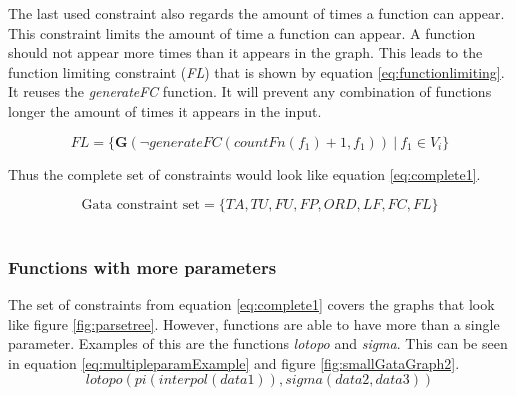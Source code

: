 \documentclass{article}
\begin{document}
The last used constraint also regards the amount of times a function can appear. This constraint limits the amount of time a function can appear. A function should not appear more times than it appears in the graph. This leads to the function limiting constraint (\textit{FL}) that is shown by equation \ref{eq:functionlimiting}. It reuses the \textit{generateFC} function. It will prevent any combination of functions longer the amount of times it appears in the input.

\begin{equation}
    FL = \{ \textbf{G}( \neg  generateFC(countFn(f_1) +1, f_1))\ |\ f_1 \in V_i \} \label{eq:functionlimiting}
\end{equation}


Thus the complete set of constraints would look like equation \ref{eq:complete1}.

\begin{equation}
    \text{Gata constraint set}= \{TA, TU, FU, FP, ORD, LF, FC,FL\} \label{eq:complete1}
\end{equation}
 \\
 
 


\subsubsection{Functions with more parameters}

The set of constraints from equation \ref{eq:complete1} covers the graphs that look like figure \ref{fig:parsetree}. However, functions are able to have more than a single parameter. Examples of this are the functions \textit{lotopo} and \textit{sigma}. This can be seen in equation \ref{eq:multipleparamExample} and figure \ref{fig:smallGataGraph2}. 
\begin{equation}
lotopo(pi(interpol(data1)),sigma(data2,data3)) \label{eq:multipleparamExample}
\end{equation}
\end{document}
